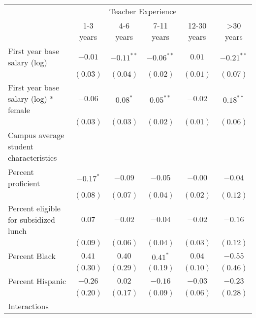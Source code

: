 \documentclass[12pt,]{article}
\begin{document}
\begin{table}
\begin{center}
\begin{tabular}{l c c c c c }
\hline
 & \multicolumn{4}{c}{Teacher Experience} \\ \cline{2-6}
 & 1-3 years & 4-6 years & 7-11 years & 12-30 years & >30 years \\
\hline
First year base salary (log)                & $-0.01$      & $-0.11^{**}$ & $-0.06^{**}$ & $0.01$      & $-0.21^{**}$ \\
                                            & $(0.03)$     & $(0.04)$     & $(0.02)$     & $(0.01)$    & $(0.07)$     \\
First year base salary (log) * female       & $-0.06$      & $0.08^{*}$   & $0.05^{**}$  & $-0.02$     & $0.18^{**}$  \\
                                            & $(0.03)$     & $(0.03)$     & $(0.02)$     & $(0.01)$    & $(0.06)$     \\
Campus average student characteristics      &              &              &              &             &              \\
\quad Percent proficient                    & $-0.17^{*}$  & $-0.09$      & $-0.05$      & $-0.00$     & $-0.04$      \\
                                            & $(0.08)$     & $(0.07)$     & $(0.04)$     & $(0.02)$    & $(0.12)$     \\
\quad Percent eligible for subsidized lunch & $0.07$       & $-0.02$      & $-0.04$      & $-0.02$     & $-0.16$      \\
                                            & $(0.09)$     & $(0.06)$     & $(0.04)$     & $(0.03)$    & $(0.12)$     \\
\quad Percent Black                         & $0.41$       & $0.40$       & $0.41^{*}$   & $0.04$      & $-0.55$      \\
                                            & $(0.30)$     & $(0.29)$     & $(0.19)$     & $(0.10)$    & $(0.46)$     \\
\quad Percent Hispanic                      & $-0.26$      & $0.02$       & $-0.16$      & $-0.03$     & $-0.23$      \\
                                            & $(0.20)$     & $(0.17)$     & $(0.09)$     & $(0.06)$    & $(0.28)$     \\
Interactions                                &              &              &              &             &              \\

\end{tabular}
\end{center}
\end{table}
\end{document}
